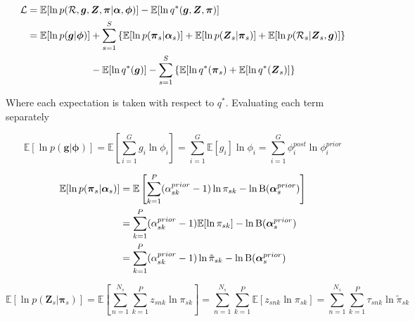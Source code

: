 \documentclass{article}
\begin{document}
\begin{align}
\label{eq:cnv_evidence}
\begin{split}
\mathcal{L} &= \mathbb{E}[\ln p(\mathcal{R}, \boldsymbol{g}, \boldsymbol{Z}, \boldsymbol{\pi} | \boldsymbol{\alpha}, \boldsymbol{\phi})] - \mathbb{E} [\ln q^*(\boldsymbol{g}, \boldsymbol{Z}, \boldsymbol{\pi})] \\
&= \mathbb{E}[\ln p(\boldsymbol{g} | \boldsymbol{\phi})] + \sum_{s = 1}^S \left\{ \mathbb{E}[\ln p(\boldsymbol{\pi}_s | \boldsymbol{\alpha}_s)] + \mathbb{E}[\ln p(\boldsymbol{Z}_s | \boldsymbol{\pi}_s)] + \mathbb{E}[\ln p(\mathcal{R}_s | \boldsymbol{Z}_s, \boldsymbol{g})] \right\} \notag \\
     &\phantom{{}=\mathbb{E}[\ln p(\boldsymbol{g} | \boldsymbol{\phi})] } - \mathbb{E}[\ln q^*(\boldsymbol{g})] - \sum_{s = 1}^S \left\{ \mathbb{E}[\ln q^*(\boldsymbol{\pi}_s) + \mathbb{E}[\ln q^*(\boldsymbol{Z}_s)] \right\}
\end{split}
\end{align}

Where each expectation is taken with respect to $q^*$. Evaluating each term separately

\begin{equation}
\mathbb{E}[\ln p(\boldsymbol{g} | \boldsymbol{\phi})] = \mathbb{E}\left[\sum_{i = 1}^G g_i \ln \phi_i\right] = \sum_{i = 1}^G \mathbb{E}[g_i] \ln \phi_i = \sum_{i = 1}^G \phi_i^{post} \ln \phi_i^{prior}
\end{equation}

\begin{align}
\mathbb{E}[\ln p(\boldsymbol{\pi}_s | \boldsymbol{\alpha}_s)] &= \mathbb{E}\left[\sum_{k = 1}^P (\alpha_{sk}^{prior} - 1) \ln \pi_{sk} - \ln \text{B}(\boldsymbol{\alpha}_s^{prior})\right] \notag \\ 
&= \sum_{k = 1}^P (\alpha_{sk}^{prior} - 1) \mathbb{E} [\ln \pi_{sk}] - \ln \text{B}(\boldsymbol{\alpha}_s^{prior}) \notag \\
 &= \sum_{k = 1}^P (\alpha_{sk}^{prior} - 1) \ln \tilde{\pi}_{sk} - \ln \text{B}(\boldsymbol{\alpha}_s^{prior})
\end{align}

\begin{equation}
\mathbb{E}[\ln p(\boldsymbol{Z}_s | \boldsymbol{\pi}_s)] = \mathbb{E}\left[\sum_{n = 1}^{N_s} \sum_{k = 1}^P z_{snk} \ln \pi_{sk} \right] 
= \sum_{n = 1}^{N_s} \sum_{k = 1}^P \mathbb{E}[z_{snk} \ln \pi_{sk}]
= \sum_{n = 1}^{N_s} \sum_{k = 1}^P \tau_{snk} \ln \tilde{\pi}_{sk}
\end{equation}
\end{document}
